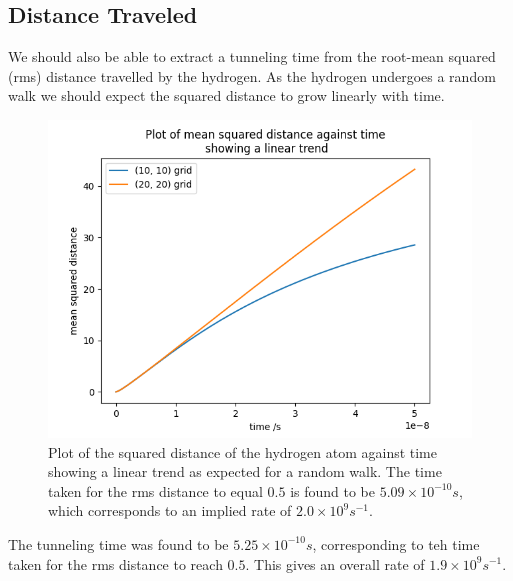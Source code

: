 \subsection{Distance Traveled}
We should also be able to
extract a tunneling time from
the root-mean squared (rms)
distance travelled by the
hydrogen. As the hydrogen
undergoes a random walk we should
expect the squared distance to
grow linearly with time.
\begin{figure}
    \centering
    \includegraphics[width=0.5\linewidth]{Figures/Redfield/Plot of lindblad solution squared distance.png}
    \caption{Plot of the squared distance
    of the hydrogen atom against time
    showing a linear trend as expected
    for a random walk. The time taken
    for the rms distance to equal \(0.5\)
    is found to be
    \(5.09\times{}10^{-10}s\),
    which corresponds to an implied rate
    of \(2.0 \times 10^{9}s^{-1}\).
    }
\end{figure}
The tunneling time was
found to be \(5.25\times{}10^{-10}s\),
corresponding to teh time taken
for the rms distance to
reach \(0.5\). This gives
an overall rate of
\(1.9 \times 10^{9}s^{-1}\).

